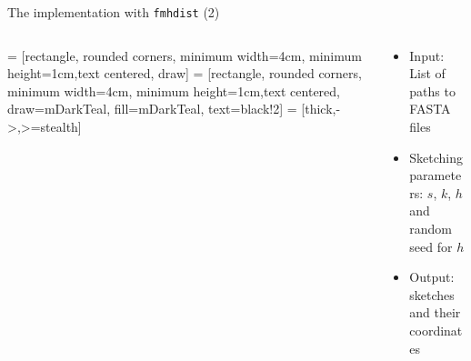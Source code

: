 \documentclass[aspectratio=169]{beamer}
\begin{document}
\begin{frame}{The implementation with \texttt{fmhdist} (2)}
    \begin{columns}
        \begin{column}{0.5\textwidth}
             = [rectangle, rounded corners, minimum width=4cm, minimum height=1cm,text centered, draw]
             = [rectangle, rounded corners, minimum width=4cm, minimum height=1cm,text centered, draw=mDarkTeal, fill=mDarkTeal, text=black!2]
             = [thick,->,>=stealth]
        \end{column}
        \begin{column}{0.5\textwidth}
            \begin{itemize}
                \item Input: List of paths to FASTA files
                \item Sketching parameters: $s$, $k$, $h$ and random seed for $h$
                \item Output: sketches and their coordinates
            \end{itemize}
        \end{column}
        \end{columns}   
\end{frame}
\end{document}
